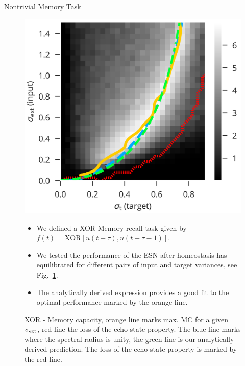 \documentclass{beamer}
\begin{document}
\begin{frame}[t]
\begin{columns}[t]
\begin{column}{.55\textwidth}
\begin{myblock}{Nontrivial Memory Task}
	\begin{figure}
		\begin{minipage}[c]{0.5\textwidth}
			\includegraphics[width=\textwidth]{../figures/xor_task.png}
		\end{minipage}\hfill
		\begin{minipage}[l]{0.5\textwidth}
			\begin{itemize}
				\item We defined a XOR-Memory recall task given by $f(t) = \mathrm{XOR}\left[u(t-\tau),u(t-\tau-1)\right]$.
				\item We tested the performance of the ESN after homeostasis has equilibrated for different pairs of input and target variances, see Fig.~\ref{fig:sweep_sim}.
				\item The analytically derived expression provides a good fit to the optimal performance marked by the orange line.
			\end{itemize}
			\vspace{10pt}
			\caption{XOR - Memory capacity, orange line marks max. MC for a given $\sigma_{\rm ext}$, red line the loss of the echo state property. The blue line marks where the spectral radius is unity, the green line is our analytically derived prediction. The loss of the echo state property is marked by the red line.}
			\label{fig:sweep_sim}
		\end{minipage}
	\end{figure}
	

\end{myblock}
\end{column}
\end{columns}
\end{frame}
\end{document}
